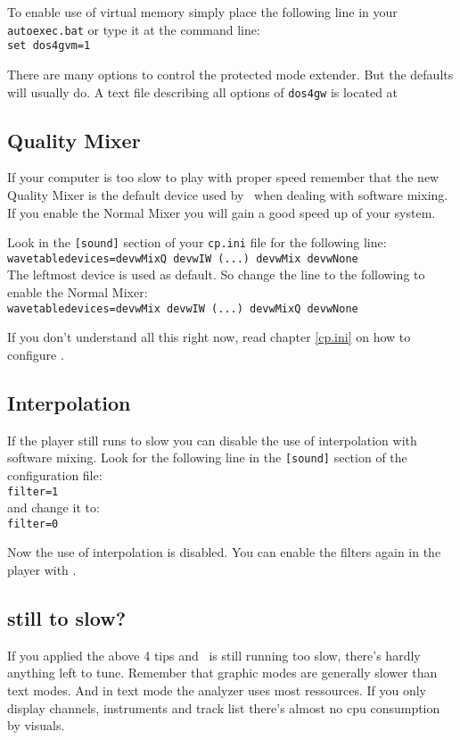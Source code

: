 To enable use of virtual memory simply place the following line in your
\texttt{autoexec.bat} or type it at the command line: \\
\texttt{set dos4gvm=1}

There are many options to control the protected mode extender. But the
defaults will usually do. A text file describing all options of
\texttt{dos4gw} is located at\\

\subsection{Quality Mixer}
If your computer is too slow to play with proper speed remember that the new
Quality Mixer is the default device used by \cp\ when dealing with software
mixing. If you enable the Normal Mixer you will gain a good speed up of your
system.

Look in the \texttt{[sound]} section of your \texttt{cp.ini} file for the
following line: \\
\texttt{wavetabledevices=devwMixQ devwIW (...) devwMix devwNone} \\
The leftmost device is used as default. So change the line to the following
to enable the Normal Mixer: \\
\texttt{wavetabledevices=devwMix devwIW (...) devwMixQ devwNone}

If you don't understand all this right now, read chapter \ref{cp.ini} on how
to configure \cp.

\subsection{Interpolation}
If the player still runs to slow you can disable the use of interpolation
with software mixing. Look for the following line in the \texttt{[sound]}
section of the configuration file: \\
\texttt{filter=1} \\
and change it to: \\
\texttt{filter=0}

Now the use of interpolation is disabled. You can enable the filters again
in the player with .

\subsection{still to slow?}
If you applied the above 4 tips and \cp\ is still running too slow, there's
hardly anything left to tune. Remember that graphic modes are generally slower
than text modes. And in text mode the analyzer uses most ressources. If you
only display channels, instruments and track list there's almost no cpu
consumption by visuals.

